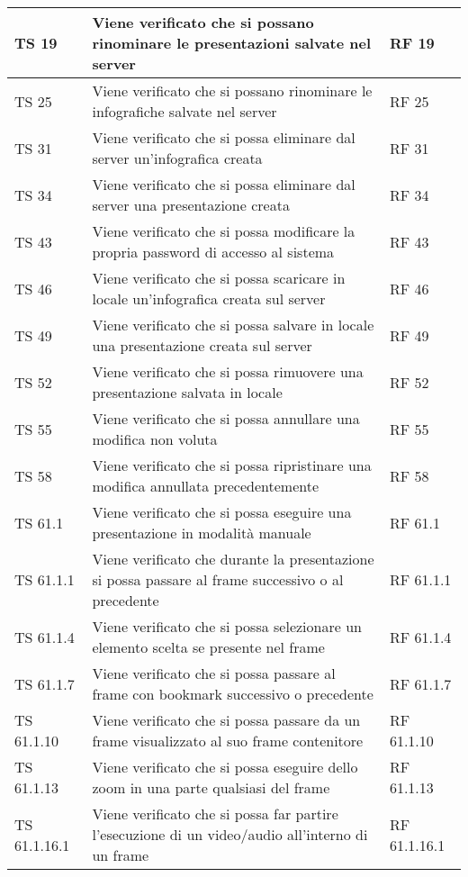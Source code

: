 {{\begin{longtable} [c]{| p{3cm} | p{6cm} |p{3cm}|}
			\hline
			TS 19 & Viene verificato che si possano rinominare le presentazioni salvate nel server & RF 19\\
			\hline
			TS 25 & Viene verificato che si possano rinominare le infografiche salvate nel server & RF 25\\
			\hline
			TS 31 & Viene verificato che si possa eliminare dal server un'infografica creata & RF 31\\
			\hline
			TS 34 & Viene verificato che si possa eliminare dal server\ped{g} una presentazione creata & RF 34\\
			\hline
			TS 43 & Viene verificato che si possa modificare la propria password di accesso al sistema & RF 43\\
			\hline
			TS 46 & Viene verificato che si possa scaricare in locale un'infografica\ped{g} creata sul server\ped{g} & RF 46\\
			\hline
			TS 49 & Viene verificato che si possa salvare in locale una presentazione creata sul server\ped{g} & RF 49\\
			\hline
			TS 52 & Viene verificato che si possa rimuovere una presentazione salvata in locale & RF 52\\
			\hline
			TS 55 & Viene verificato che si possa annullare una modifica non voluta & RF 55\\
			\hline
			TS 58 & Viene verificato che si possa ripristinare una modifica annullata precedentemente  & RF 58\\
			\hline
			TS 61.1 & Viene verificato che si possa eseguire una presentazione in modalità manuale & RF 61.1\\
			\hline
			TS 61.1.1 & Viene verificato che durante la presentazione si possa passare al frame\ped{g} successivo o al precedente & RF 61.1.1\\
			\hline
			TS 61.1.4 & Viene verificato che si possa selezionare un elemento scelta\ped{g} se presente nel frame\ped{g} & RF 61.1.4\\
			\hline
			TS 61.1.7 & Viene verificato che si possa passare al frame\ped{g} con bookmark\ped{g} successivo o precedente & RF 61.1.7\\
			\hline
			TS 61.1.10 & Viene verificato che si possa passare da un frame\ped{g} visualizzato al suo frame\ped{g} contenitore & RF 61.1.10\\
			\hline
			TS 61.1.13 & Viene verificato che si possa eseguire dello zoom in una parte qualsiasi del frame\ped{g} & RF 61.1.13\\
			\hline
			TS 61.1.16.1 & Viene verificato che si possa far partire l'esecuzione di un video/audio all'interno di un frame\ped{g} & RF 61.1.16.1\\

\end{longtable}}}
